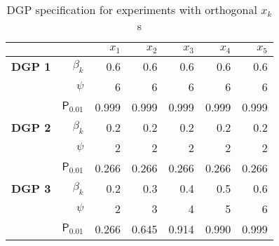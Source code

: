 \begin{table}[h]
\centering
\begin{tabular}{r |r |r |r |r |r |r}

&  &$x_{1}$ &$x_{2}$ &$x_{3}$ &  $x_{4}$ & $x_{5}$  \\
\hline
\textbf{DGP 1} & $\beta_{k}$  & 0.6 &0.6 &0.6 &  0.6 & 0.6 \\

 	& $\psi$  &6 &6 &6 &6 &6 \\
 
   & $ \mathsf{P}_{0.01}$  & 0.999 & 0.999 & 0.999 & 0.999 & 0.999 \\
\hline
\textbf{DGP 2} & $\beta_{k}$ &  0.2 &0.2 &0.2 &  0.2 & 0.2 \\

 	& $\psi$  &2 &2 &2 &2 &2 \\
       & $ \mathsf{P}_{0.01}$ & 0.266 & 0.266 & 0.266 & 0.266 & 0.266 \\
\hline
\textbf{DGP 3} & $\beta_{k}$  & 0.2 &0.3 &0.4 &  0.5 & 0.6 \\

 	& $\psi$  &2 &3 &4 &5 &6 \\
       & $ \mathsf{P}_{0.01}$ & 0.266 & 0.645 & 0.914 & 0.990 & 0.999 \\
    
\end{tabular}
\caption{DGP specification for experiments with orthogonal $x_{k}$s}
\label{DGPspec123}
\end{table}



